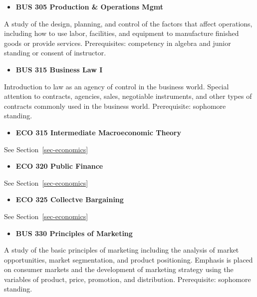 \documentclass[
  letterpaper,
]{scrbook}
\providecommand{\tightlist}{%
  \setlength{\itemsep}{0pt}\setlength{\parskip}{0pt}}
\begin{document}
\begin{itemize}
\tightlist
\item
  \textbf{BUS 305 Production \& Operations Mgmt}
\end{itemize}

A study of the design, planning, and control of the factors that affect
operations, including how to use labor, facilities, and equipment to
manufacture finished goods or provide services. Prerequisites:
competency in algebra and junior standing or consent of instructor.

\begin{itemize}
\tightlist
\item
  \textbf{BUS 315 Business Law I}
\end{itemize}

Introduction to law as an agency of control in the business world.
Special attention to contracts, agencies, sales, negotiable instruments,
and other types of contracts commonly used in the business world.
Prerequisite: sophomore standing.

\begin{itemize}
\tightlist
\item
  \textbf{ECO 315 Intermediate Macroeconomic Theory}
\end{itemize}

See Section~\ref{sec-economics}

\begin{itemize}
\tightlist
\item
  \textbf{ECO 320 Public Finance}
\end{itemize}

See Section~\ref{sec-economics}

\begin{itemize}
\tightlist
\item
  \textbf{ECO 325 Collectve Bargaining}
\end{itemize}

See Section~\ref{sec-economics}

\begin{itemize}
\tightlist
\item
  \textbf{BUS 330 Principles of Marketing}
\end{itemize}

A study of the basic principles of marketing including the analysis of
market opportunities, market segmentation, and product positioning.
Emphasis is placed on consumer markets and the development of marketing
strategy using the variables of product, price, promotion, and
distribution. Prerequisite: sophomore standing.
\end{document}
